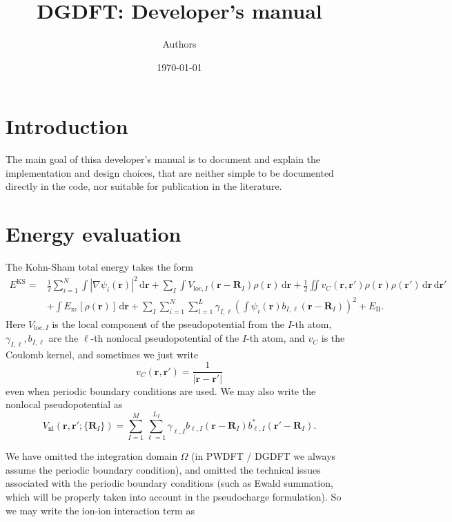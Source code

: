 \documentclass{article}
\newcommand{\bvec}[1]{\mathbf{#1}}
\newcommand{\vr}{\bvec{r}}
\newcommand{\vR}{\bvec{R}}
\newcommand{\ud}{\,\mathrm{d}}
\newcommand{\II}{\mathrm{II}}
\theoremstyle{plain}
\theoremstyle{remark}
\theoremstyle{plain}
\theoremstyle{plain}
\theoremstyle{plain}
\begin{document}
\title{DGDFT: Developer's manual}
\author{Authors}
\date{\today}
\maketitle


\section{Introduction}

The main goal of thisa developer's manual is to document and explain the implementation and design choices, that are neither simple to be documented directly in the code, nor suitable for publication in the literature.  

\section{Energy evaluation}

The Kohn-Sham total energy takes the form
\begin{equation}
    \begin{aligned}
    E^{\text{KS}}=& \frac{1}{2} \sum_{i=1}^{N} \int \left|\nabla \psi_{i}(\vr)\right|^{2} \ud \vr +\sum_{I} \int V_{\text{loc}, I}\left(\vr-\vR_{I}\right) \rho(\vr) \ud \vr +\frac{1}{2} \iint v_C(\vr,\vr')\rho(\vr) \rho(\vr') \ud \vr \ud \vr'\\
    &+\int E_{\text{xc}}[\rho(\vr)]\ud \vr+\sum_{I} \sum_{i=1}^{N} \sum_{l=1}^{L} \gamma_{I, \ell}\left(\int \psi_{i}(\vr) b_{I, \ell}\left(\vr-\vR_{I}\right)\right)^{2} +E_{\II}. 
    \end{aligned}
\label{eqn:KSEnergy}
\end{equation}
Here $V_{\text{loc},I}$ is the local component of the pseudopotential from the $I$-th atom, $\gamma_{I,\ell},b_{I,\ell}$ are the $\ell$-th nonlocal pseudopotential of the $I$-th atom, and $v_C$ is the Coulomb kernel, and sometimes we just write
\begin{equation}
v_C(\vr,\vr')=\frac{1}{|\vr-\vr'|}
\label{eqn:vC}
\end{equation}
even when periodic boundary conditions are used. 
We may also write the nonlocal pseudopotential as
\begin{equation}
V_{\text{nl}}(\vr,\vr';\{\vR_{I}\})=\sum_{I=1}^{M}\sum_{\ell=1}^{L_{I}} \gamma_{\ell,I}
  b_{\ell,I}(\vr-\vR_{I}) b_{\ell,I}^{*}(\vr'-\vR_{I}).
\label{eqn:nonlocal}
\end{equation}

We have omitted the integration domain $\Omega$ (in PWDFT / DGDFT we always assume the periodic boundary condition), and omitted the technical issues associated with the periodic boundary conditions (such as Ewald summation, which will be properly taken into account in the pseudocharge formulation). So we may write the ion-ion interaction term as
\end{document}

